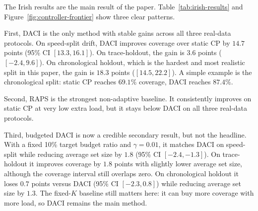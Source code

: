 \documentclass[conference]{IEEEtran}
\begin{document}
\begin{table}[t]
\caption{Irish Repeated-Split Results}
\label{tab:irish-results}
\centering
\scriptsize
{}
\end{table}

The Irish results are the main result of the paper. Table~\ref{tab:irish-results} and Figure~\ref{fig:controller-frontier} show three clear patterns.

First, DACI is the only method with stable gains across all three real-data protocols. On speed-split drift, DACI improves coverage over static CP by $14.7$ points (95\% CI $[13.3,16.1]$). On trace-holdout, the gain is $3.6$ points ($[-2.4,9.6]$). On chronological holdout, which is the hardest and most realistic split in this paper, the gain is $18.3$ points ($[14.5,22.2]$). A simple example is the chronological split: static CP reaches $69.1\%$ coverage, DACI reaches $87.4\%$.

Second, RAPS is the strongest non-adaptive baseline. It consistently improves on static CP at very low extra load, but it stays below DACI on all three real-data protocols.

Third, budgeted DACI is now a credible secondary result, but not the headline. With a fixed 10\% target budget ratio and $\gamma=0.01$, it matches DACI on speed-split while reducing average set size by $1.8$ (95\% CI $[-2.4,-1.3]$). On trace-holdout it improves coverage by $1.8$ points with slightly lower average set size, although the coverage interval still overlaps zero. On chronological holdout it loses $0.7$ points versus DACI (95\% CI $[-2.3,0.8]$) while reducing average set size by $1.3$. The fixed-$K$ baseline still matters here: it can buy more coverage with more load, so DACI remains the main method.
\end{document}
